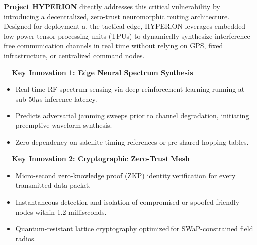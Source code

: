 \documentclass[10pt,a4paper]{article}
\begin{document}
\textbf{Project HYPERION} directly addresses this critical vulnerability by introducing a decentralized, zero-trust neuromorphic routing architecture. Designed for deployment at the tactical edge, HYPERION leverages embedded low-power tensor processing units (TPUs) to dynamically synthesize interference-free communication channels in real time without relying on GPS, fixed infrastructure, or centralized command nodes.

\vspace{4pt}

\noindent
\begin{minipage}[t]{0.485\linewidth}
  \begin{tcolorbox}[cardbox]
    \textbf{\color{NavyPrimary}\faMicrochip \ \ Key Innovation 1: Edge Neural Spectrum Synthesis}
    \vspace{2pt}
    \begin{itemize}[leftmargin=11pt,label=\tiny$\blacksquare$,itemsep=1pt]
      \item Real-time RF spectrum sensing via deep reinforcement learning running at sub-50$\mu$s inference latency.
      \item Predicts adversarial jamming sweeps prior to channel degradation, initiating preemptive waveform synthesis.
      \item Zero dependency on satellite timing references or pre-shared hopping tables.
    \end{itemize}
  \end{tcolorbox}
\end{minipage}%
\hfill
\begin{minipage}[t]{0.485\linewidth}
  \begin{tcolorbox}[cardbox]
    \textbf{\color{NavyPrimary}\faLock \ \ Key Innovation 2: Cryptographic Zero-Trust Mesh}
    \vspace{2pt}
    \begin{itemize}[leftmargin=11pt,label=\tiny$\blacksquare$,itemsep=1pt]
      \item Micro-second zero-knowledge proof (ZKP) identity verification for every transmitted data packet.
      \item Instantaneous detection and isolation of compromised or spoofed friendly nodes within 1.2 milliseconds.
      \item Quantum-resistant lattice cryptography optimized for SWaP-constrained field radios.
    \end{itemize}
  \end{tcolorbox}
\end{minipage}
\end{document}
